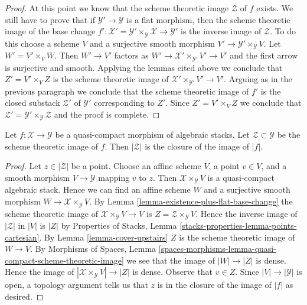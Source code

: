 \begin{proof}
\medskip\noindent
At this point we know that the scheme theoretic image $\mathcal{Z}$ of $f$
exists. We still have to prove that if $\mathcal{Y}' \to \mathcal{Y}$ is a
flat morphism, then the scheme theoretic image of the base change
$f' : \mathcal{X}' = \mathcal{Y}' \times_\mathcal{Y} \mathcal{X} \to
\mathcal{Y}'$ is the inverse image of $\mathcal{Z}$.
To do this choose a scheme $V$ and a surjective smooth morphism
$V' \to \mathcal{Y}' \times_\mathcal{Y} V$.
Let $W' = V' \times_V W$. Then $W' \to V'$ factors as
$W' \to \mathcal{X}' \times_{\mathcal{Y}'} V' \to V'$
and the first arrow is surjective and smooth.
Applying the lemmas cited above we conclude that
$Z' = V' \times_V Z$ is the scheme theoretic image
of $\mathcal{X}' \times_{\mathcal{Y}'} V' \to V'$.
Arguing as in the previous paragraph we conclude
that the scheme theoretic image of $f'$ is the
closed substack $\mathcal{Z}'$ of $\mathcal{Y}'$ corresponding to $Z'$.
Since $Z' = V' \times_V Z$ we conclude that
$\mathcal{Z}' = \mathcal{Y}' \times_\mathcal{Y} \mathcal{Z}$
and the proof is complete.
\end{proof}

\begin{lemma}
\label{lemma-topology-scheme-theoretic-image}
Let $f : \mathcal{X} \to \mathcal{Y}$ be a quasi-compact
morphism of algebraic stacks. Let $\mathcal{Z} \subset \mathcal{Y}$
be the scheme theoretic image of $f$. Then $|\mathcal{Z}|$
is the closure of the image of $|f|$.
\end{lemma}

\begin{proof}
Let $z \in |\mathcal{Z}|$ be a point.
Choose an affine scheme $V$, a point $v \in V$, and a smooth morphism
$V \to \mathcal{Y}$ mapping $v$ to $z$.
Then $\mathcal{X} \times_\mathcal{Y} V$ is a quasi-compact algebraic stack.
Hence we can find an affine scheme $W$ and a surjective smooth
morphism $W \to \mathcal{X} \times_\mathcal{Y} V$.
By Lemma \ref{lemma-existence-plus-flat-base-change}
the scheme theoretic image of
$\mathcal{X} \times_\mathcal{Y} V \to V$ is
$Z = \mathcal{Z} \times_\mathcal{Y} V$.
Hence the inverse image of $|\mathcal{Z}|$ in $|V|$ is $|Z|$ by
Properties of Stacks, Lemma \ref{stacks-properties-lemma-points-cartesian}.
By Lemma \ref{lemma-cover-upstairs} $Z$ is
the scheme theoretic image of $W \to V$.
By Morphisms of Spaces, Lemma
\ref{spaces-morphisms-lemma-quasi-compact-scheme-theoretic-image}
we see that the image of $|W| \to |Z|$ is dense.
Hence the image of $|\mathcal{X} \times_\mathcal{Y} V| \to |Z|$
is dense. Observe that $v \in Z$.
Since $|V| \to |\mathcal{Y}|$ is open, a topology argument
tells us that $z$ is in the closure of the image of $|f|$ as desired.
\end{proof}









